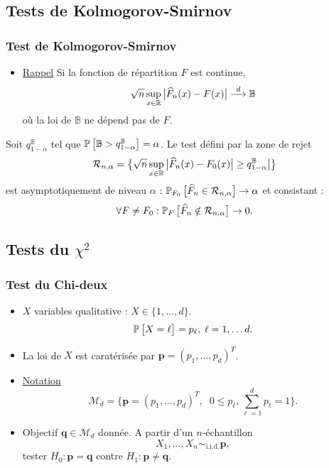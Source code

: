 \subsection{Tests de Kolmogorov-Smirnov}

\begin{frame}
\frametitle{Test de Kolmogorov-Smirnov}
\begin{itemize}
\item \underline{Rappel} Si la fonction de répartition $F$ est continue,
$$\sqrt{n}\sup_{x\in \operatorname{{\mathbb R}}}\big|\widehat F_n(x)-F(x)\big| \stackrel{d}{\longrightarrow} \mathbb{B}$$
où la loi de $\mathbb{B}$ ne dépend pas de $F$.
\end{itemize}
\begin{prop}
Soit $q_{1-\alpha}^{\mathbb{B}}$ tel que $\operatorname{{\mathbb P}}\big[\mathbb{B}>q_{1-\alpha}^{\mathbb{B}}\big]=\alpha$. Le test défini par la zone de rejet
$${\mathcal R}_{n,\alpha} = \big\{\sqrt{n}\sup_{x\in \operatorname{{\mathbb R}}}\big|\widehat F_n(x)-F_0(x)\big| \geq q_{1-\alpha}^{\mathbb{B}}\big|\big\}$$
est \alert{asymptotiquement de niveau $\alpha$ :}
$\operatorname{{\mathbb P}}_{F_0}\big[\widehat F_n \in {\mathcal R}_{n,\alpha}\big]\rightarrow \alpha$
et \alert{consistant} :
$$\forall F \neq F_0: \operatorname{{\mathbb P}}_{F}\big[\widehat F_n \notin {\mathcal R}_{n,\alpha}\big] \rightarrow 0.$$
\end{prop}
\end{frame}

\subsection{Tests du $\chi^2$}

\begin{frame}
\frametitle{Test du Chi-deux}
\begin{itemize}
\item $X$ variables \alert{qualitative} : $X \in \{1,\ldots, d\}$.
$$\operatorname{{\mathbb P}}\big[X=\ell\big]=p_\ell,\;\ell=1,\ldots d.$$
\item La loi de $X$ est caratérisée par ${\boldsymbol p} = (p_1,\ldots, p_d)^T$.
\item \underline{Notation}
$${\mathcal M}_d  = \big\{{\boldsymbol p}=(p_1,\ldots, p_d)^T,\;\;0 \leq p_\ell,\sum_{\ell=1}^dp_\ell=1\big\}.$$
\item \alert{Objectif} ${\boldsymbol q}\in {\mathcal M}_d$ donnée. A partir d'un $n$-échantillon
$$X_1,\ldots, X_n \sim_{\text{i.i.d.}}{\boldsymbol p},$$
tester
$H_0:{\boldsymbol p}={\boldsymbol q}$ \alert{contre} $H_1:{\boldsymbol p}\neq{\boldsymbol q}.$
\end{itemize}
\end{frame}

